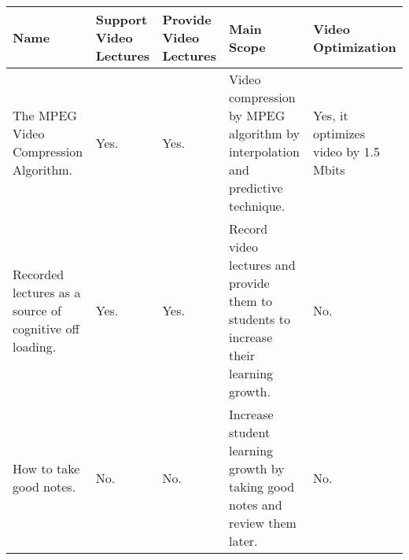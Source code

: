 \begin{sideways}
\centering


\begin{tabularx}{1.5\textwidth} { 
  | >{\raggedright\arraybackslash}X 
  | >{\centering\arraybackslash}X | >{\centering\arraybackslash}X | >{\centering\arraybackslash}X | >{\centering\arraybackslash}X | }  
  
 \hline
\bfseries{Name} & \bfseries{Support Video Lectures} &\bfseries{Provide Video Lectures} &\bfseries{Main Scope} & \bfseries{Video Optimization}  \\
\hline
The MPEG Video Compression Algorithm.\cite{LeGall1992}
& Yes.
& Yes.
& Video compression by MPEG algorithm by interpolation and predictive technique.  
& Yes, it optimizes video by 1.5 Mbits
\\
\hline

Recorded lectures as a source of cognitive off loading.\cite{Patel2019}
& Yes.
& Yes.
& Record video lectures and provide them to students to increase their learning growth.
& No.
\\

\hline
How to take good notes.\cite{Kiewra2018}
& No.
& No.
& Increase student learning growth by taking good notes and review them later.
& No.
\\
\hline

\end{tabularx}

\end{sideways}


